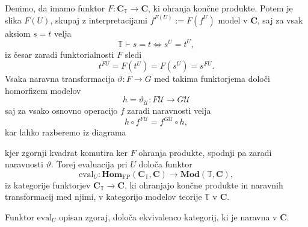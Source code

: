 \documentclass[../kategoricna_logika.tex]{subfiles}
\begin{document}
Denimo, da imamo funktor $F : \mathbf{C}_{\mathbb{T}} \to \mathbf{C}$,
ki ohranja končne produkte.
Potem je slika $F(U)$, skupaj z interpretacijami
$f^{F(U)} := F(f^U)$ model v $\mathbf{C}$, saj za
vsak aksiom $s = t$ velja
$$\mathbb{T} \vdash s = t  \iff  s^U = t^U,$$
%
iz česar zaradi funktorialnosti $F$ sledi
$$t^{FU} = F(t^U) = F(s^U) = s^{FU}.$$
%
Vsaka naravna transformacija $\vartheta : F \to G$ med takima
funktorjema določi homorfizem modelov
$$h = \vartheta_\mathcal{U} : F\mathcal{U} \to G\mathcal{U}$$
%
saj za vsako osnovno operacijo $f$ zaradi naravnosti velja
$$h \circ f^{F\mathcal{U}} = f^{G\mathcal{U}} \circ h,$$
kar lahko razberemo iz diagrama
\begin{center}
\end{center}
kjer zgornji kvadrat komutira ker $F$ ohranja produkte, spodnji
pa zaradi naravnosti $\vartheta$. Torej evaluacija pri $U$ določa funktor
\[ \mathrm{eval}_U : \mathbf{Hom}_{\mathrm{FP}}(\mathbf{C}_{\mathbb{T}}, \mathbf{C}) \to \mathbf{Mod}(\mathbb{T}, \mathbf{C}), \]
iz kategorije funktorjev $\mathbf{C}_{\mathbb{T}} \to \mathbf{C}$,
ki ohranjajo končne produkte in naravnih transformacij med njimi,
v kategorijo modelov teorije $\mathbb{T}$ v $\mathbf{C}$.
\begin{trditev}\label{trditev:modeli-so-funktorji}
  Funktor $\mathrm{eval}_U$ opisan zgoraj, določa ekvivalenco kategorij,
  ki je naravna v $\mathbf{C}$.
\end{trditev}
\end{document}
